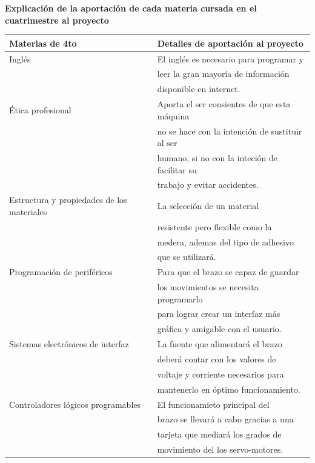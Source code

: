 \documentclass[letterpaper]{article}
\begin{document}
\begin{large}
\textbf{Explicación de la aportación  de cada materia cursada en el cuatrimestre al proyecto}


\begin{table}[htbp]
    \centering
   
   
    \begin{tabular}{|l|l|}
    \hline
Materias de 4to  &  Detalles de aportación al proyecto 
                        \\ \hline
Inglés & El inglés es necesario para programar y\\
        & leer la gran mayoría de información\\
        & disponible en internet.
                        \\ \hline
Ética profesional & Aporta el ser consientes de que esta máquina \\
                  & no se hace con la intención de sustituir al ser\\
                  & humano, si no con la inteción de facilitar su\\ 
                  & trabajo y evitar accidentes. 
                        \\\hline
Estructura y propiedades de los materiales & La selección de un material\\
                                 & resistente pero flexible como la\\
                                 & medera, ademas del tipo de adhesivo\\
                                 & que se utilizará.
                        \\\hline
Programación de periféricos & Para que el brazo se capaz de guardar\\
                            & los movimientos se necesita programarlo\\
                            & para lograr crear un interfaz más\\
                            & gráfica y amigable con el usuario.
                        \\\hline
Sistemas electrónicos de interfaz & La fuente que alimentará el brazo\\
                                 & deberá contar con los valores de\\
                                 & voltaje y corriente necesarios para\\
                                 & mantenerlo en óptimo funcionamiento.
                        \\\hline
Controladores lógicos programables & El funcionamieto principal del\\
                                &brazo se llevará a cabo gracias a una\\
                                & tarjeta que mediará los grados de\\
                                & movimiento del los servo-motores.\\
                                \hline
        

\end{tabular}
\end{table}
\end{large}
\end{document}
